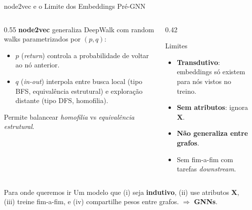 \documentclass[aspectratio=169,xcolor=dvipsnames]{beamer}
\begin{document}
  \begin{frame}{node2vec e o Limite dos Embeddings Pré-GNN}
    \begin{columns}[T]
      \begin{column}{0.55\textwidth}
        \textbf{node2vec}  generaliza DeepWalk com
        random walks parametrizados por $(p, q)$:
        \begin{itemize}
          \item $p$ (\textit{return}) controla a probabilidade de voltar ao nó anterior.
          \item $q$ (\textit{in-out}) interpola entre busca local (tipo BFS, equivalência estrutural) e exploração distante (tipo DFS, homofilia).
        \end{itemize}
        Permite balancear \textit{homofilia} vs \textit{equivalência estrutural}.
      \end{column}
      \begin{column}{0.42\textwidth}
        \begin{alertblock}{Limites}
          \begin{itemize}
            \item \textbf{Transdutivo}: embeddings só existem para nós vistos no treino.
            \item \textbf{Sem atributos}: ignora $\mathbf{X}$.
            \item \textbf{Não generaliza entre grafos}.
            \item Sem fim-a-fim com tarefas \textit{downstream}.
          \end{itemize}
        \end{alertblock}
      \end{column}
    \end{columns}

    \vspace{0.5em}
    \begin{block}{Para onde queremos ir}
      Um modelo que (i) seja \textbf{indutivo}, (ii) use atributos $\mathbf{X}$, (iii) treine
      fim-a-fim, e (iv) compartilhe pesos entre grafos. $\Rightarrow$ \textbf{GNNs}.
    \end{block}
  \end{frame}
\end{document}

